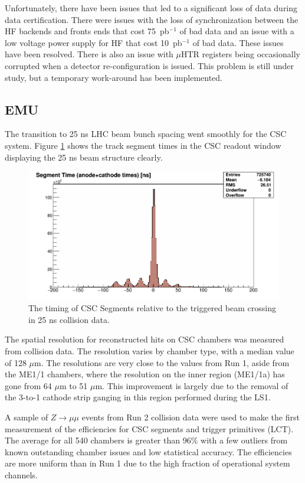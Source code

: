 Unfortunately, there have been issues that led to a significant loss of data during data certification.
There were issues with the loss of synchronization between the HF backends and fronts ends
that cost 75~pb$^{-1}$ of bad data and an issue with a low voltage power supply for HF that cost 
10~pb$^{-1}$ of bad data. These issues have been resolved. There is also an issue with 
$\mu$HTR registers being occasionally  corrupted when a detector re-configuration is issued.
This problem is still under study, but a temporary work-around has been implemented.


\subsection{EMU }
The transition to 25 ns LHC beam bunch spacing went smoothly
for the CSC system. Figure \ref{fig:emu} shows  the track segment
times in the CSC readout window displaying the 25 ns beam structure
clearly.
\begin {figure}[h]
\begin{center}
\includegraphics  [width=4.5in] {figures/mu_seg_time_25ns_psm.png}
\caption{The timing of CSC Segments relative to the triggered
beam crossing in 25 ns collision data.}
\label{fig:emu}
\end{center}
\end{figure}

The spatial resolution for reconstructed hits on CSC chambers
was measured from collision data. The resolution varies by
chamber type, with a median value of 128 $\mu$m. The resolutions
are very close to the values from Run 1, aside from the ME1/1
chambers, where the resolution on the inner region (ME1/1a) has
gone from 64 $\mu$m to 51 $\mu$m. This improvement is largely due to
the removal of the 3-to-1 cathode strip ganging in this region
performed during the LS1.

A sample of $Z\rightarrow\mu\mu$ events from Run 2 collision data were used to make
the first measurement of the efficiencies for CSC segments and
trigger primitives (LCT). The average for all 540 chambers is
greater than 96\% with a few outliers from known outstanding
chamber issues and low statistical accuracy. The efficiencies
are more uniform than in Run 1 due to the high fraction of
operational system channels.


